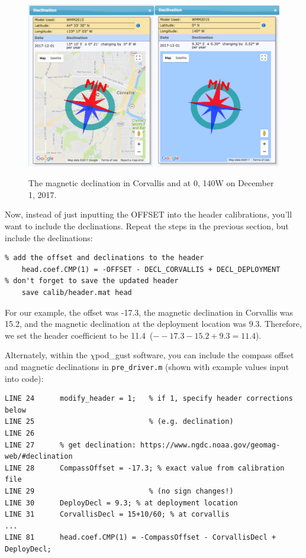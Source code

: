 \begin{figure}
  \centering \centering\noindent\includegraphics[width=14cm,angle=0]{./figs/declination_both.pdf}\\
    \caption{The magnetic declination in Corvallis and at 0\degree, 140\degree W on December 1, 2017.}\label{fig:declination}
\end{figure}

Now, instead of just inputting the OFFSET into the header calibrations, you'll want to include the declinations. Repeat the steps in the previous section, but include the declinations:
\begin{verbatim}
% add the offset and declinations to the header
    head.coef.CMP(1) = -OFFSET - DECL_CORVALLIS + DECL_DEPLOYMENT
% don't forget to save the updated header
    save calib/header.mat head
\end{verbatim}

For our example, the offset was -17.3\degree, the magnetic declination in Corvallis was 15.2\degree, and the magnetic declination at the deployment location was 9.3\degree. Therefore, we set the header coefficient to be 11.4\degree \, ($--17.3 - 15.2 + 9.3 = 11.4$).

Alternately, within the $\chi$pod\_gust software, you can include the compass offset and magnetic declinations in \texttt{pre\_driver.m} (shown with example values input into code):
\begin{verbatim}
LINE 24      modify_header = 1;   % if 1, specify header corrections below
LINE 25                           % (e.g. declination)
LINE 26
LINE 27      % get declination: https://www.ngdc.noaa.gov/geomag-web/#declination
LINE 28      CompassOffset = -17.3; % exact value from calibration file
LINE 29                           % (no sign changes!)
LINE 30      DeployDecl = 9.3; % at deployment location
LINE 31      CorvallisDecl = 15+10/60; % at corvallis
...
LINE 81      head.coef.CMP(1) = -CompassOffset - CorvallisDecl + DeployDecl;
\end{verbatim}

